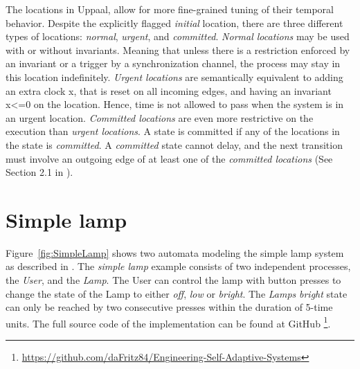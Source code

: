 \documentclass{article}
\begin{document}
The locations in Uppaal, allow for more fine-grained tuning of their temporal behavior. Despite the explicitly flagged \textit{initial} location, there are three different types of locations: \textit{normal}, \textit{urgent}, and \textit{committed}. \textit{Normal locations} may be used with or without invariants. Meaning that unless there is a restriction enforced by an invariant or a trigger by a synchronization channel, the process may stay in this location indefinitely. \textit{Urgent locations} are semantically equivalent to adding an extra clock x, that is reset on all incoming edges, and having an invariant x<=0 on the location. Hence, time is not allowed to pass when the system is in an urgent location. \textit{Committed locations} are even more restrictive on the execution than \textit{urgent locations}. A state is committed if any of the locations in the state is \textit{committed}. A \textit{committed} state cannot delay, and the next transition must involve an outgoing edge of at least one of the \textit{committed locations} (See Section 2.1 in \cite{Tut01}).

\section{Simple lamp}

Figure~\ref{fig:SimpleLamp} shows two automata modeling the simple lamp system as described in \cite{Tut01}. The \textit{simple lamp} example consists of two independent processes, the \textit{User}, and the \textit{Lamp}. The User can control the lamp with button presses to change the state of the Lamp to either \textit{off}, \textit{low} or \textit{bright}. The \textit{Lamps} \textit{bright} state can only be reached by two consecutive presses within the duration of 5-time units. The full source code of the implementation can be found at GitHub \footnote{\url{https://github.com/daFritz84/Engineering-Self-Adaptive-Systems}}.
\end{document}
